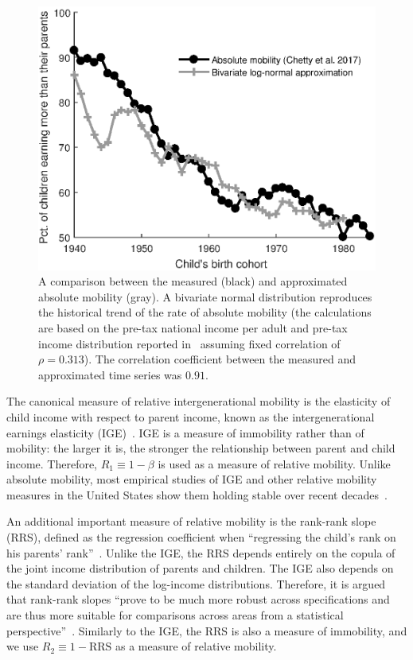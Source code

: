 \documentclass[12pt]{article}
\newcommand{\flabel}[1]{\label{fig:#1}}
\numberwithin{equation}{section}
\begin{document}
\begin{figure}[!htb]
\centering
\includegraphics[width=1.0\textwidth] {./figs/trend2.eps}
\caption{A comparison between the measured (black) and approximated absolute mobility (gray). A bivariate normal distribution reproduces the historical trend of the rate of absolute mobility (the calculations are based on the pre-tax national income per adult and pre-tax income distribution reported in~\citet{WID2017} assuming fixed correlation of $\rho=0.313$). The correlation coefficient between the measured and approximated time series was $0.91$.}
\flabel{trend}
\end{figure}

The canonical measure of relative intergenerational mobility is the elasticity of child income with respect to parent income, known as the intergenerational earnings elasticity (IGE)~\citep{mulligan1997parental,lee2009trends,chetty2014land}. IGE is a measure of immobility rather than of mobility: the larger it is, the stronger the relationship between parent and child income. Therefore, $R_1 \equiv 1-\beta$ is used as a measure of relative mobility. Unlike absolute mobility, most empirical studies of IGE and other relative mobility measures in the United States show them holding stable over recent decades~\citep{lee2009trends,hauser2010intergenerational,chetty2014land,chetty2014united}. 

An additional important measure of relative mobility is the rank-rank slope (RRS), defined as the regression coefficient when ``regressing the child's rank on his parents' rank''~\citep[p.~1561]{chetty2014land}. Unlike the IGE, the RRS depends entirely on the copula of the joint income distribution of parents and children. The IGE also depends on the standard deviation of the log-income distributions. Therefore, it is argued that rank-rank slopes ``prove to be much more robust across specifications and are thus more suitable for comparisons across areas from a statistical perspective''~\citep[p.~1561]{chetty2014land}. Similarly to the IGE, the RRS is also a measure of immobility, and we use $R_2 \equiv 1-\text{RRS}$ as a measure of relative mobility.
\end{document}
